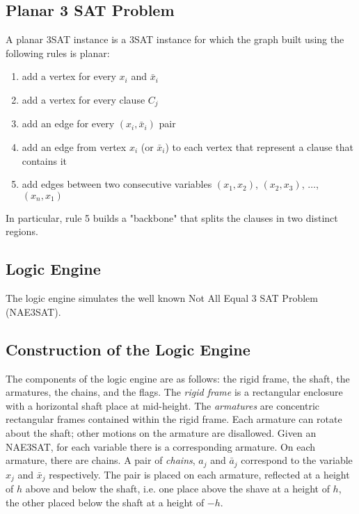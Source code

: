 \subsection{Planar 3 SAT Problem}
\begin{prob}
 A planar 3SAT instance is a 3SAT instance for which the graph built using the following rules is 
planar:
\begin{enumerate}
 \item add a vertex for every $x_i$ and $\bar{x}_i$
 \item add a vertex for every clause $C_j$
 \item add an edge for every $\left(x_i,\bar{x}_i \right)$ pair
 \item add an edge from vertex $x_i$ (or $\bar{x}_i$) to each vertex that represent a clause that 
contains it
 \item add edges between two consecutive variables $(x_1,x_2)$, $(x_2,x_3)$, $\dots$,$(x_n,x_1)$
\end{enumerate}
In particular, rule 5 builds a "backbone" that splits the clauses in two distinct regions.
\end{prob}

\subsection{Logic Engine}
The logic engine simulates the well known Not All Equal 3 SAT Problem (NAE3SAT).  
\subsection{Construction of the Logic Engine}
The components of the logic engine are as follows: the rigid frame, the shaft, the armatures, 
the chains, and the flags.  The \textit{rigid frame} is a rectangular enclosure with a horizontal 
shaft place at mid-height.  The \textit{armatures} are concentric rectangular frames contained 
within the rigid frame.  Each armature can rotate about the shaft; other motions on the armature 
are disallowed.  Given an NAE3SAT, for each variable there is a corresponding armature. On each 
armature, there are chains.  A pair of \textit{chains}, $a_j$ and $\bar{a}_j$ correspond to the 
variable $x_j$ and $\bar{x}_j$ respectively.  The pair is placed on each armature, reflected at a 
height of $h$ above and below the shaft, i.e. one place above the shave at a height of $h$, the 
other placed below the shaft at a height of $-h$.

